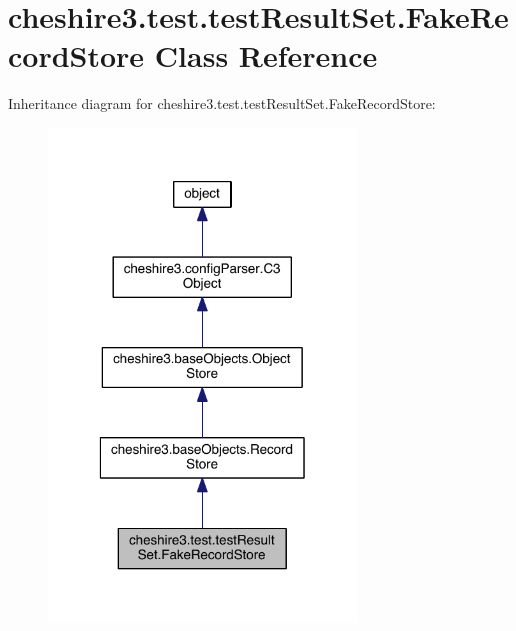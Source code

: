 \hypertarget{classcheshire3_1_1test_1_1test_result_set_1_1_fake_record_store}{\section{cheshire3.\-test.\-test\-Result\-Set.\-Fake\-Record\-Store Class Reference}
\label{classcheshire3_1_1test_1_1test_result_set_1_1_fake_record_store}
}


Inheritance diagram for cheshire3.\-test.\-test\-Result\-Set.\-Fake\-Record\-Store\-:
\nopagebreak
\begin{figure}[H]
\begin{center}
\leavevmode
\includegraphics[width=232pt]{classcheshire3_1_1test_1_1test_result_set_1_1_fake_record_store__inherit__graph}
\end{center}
\end{figure}


